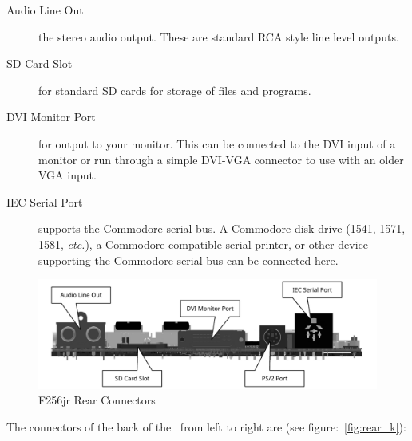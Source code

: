 \begin{description}
    \item[Audio Line Out] the stereo audio output. These are standard RCA style line level outputs.

    \item[SD Card Slot] for standard SD cards for storage of files and programs.

    \item[DVI Monitor Port] for output to your monitor. This can be connected to the DVI input of a monitor or run through a simple DVI-VGA connector to use with an older VGA input.

    \item[IEC Serial Port] supports the Commodore serial bus. A Commodore disk drive (1541, 1571, 1581, {\it etc.}), a Commodore compatible serial printer, or other device supporting the Commodore serial bus can be connected here.
\end{description}

\begin{figure}[ht]
    \begin{center}
        \includegraphics[scale=0.75]{images/f256_render_annotated_back.pdf}
    \end{center}
    \caption{F256jr Rear Connectors}
    \label{fig:rear}
\end{figure}

The connectors of the back of the \fk\ from left to right are (see figure:~\ref{fig:rear_k}):

